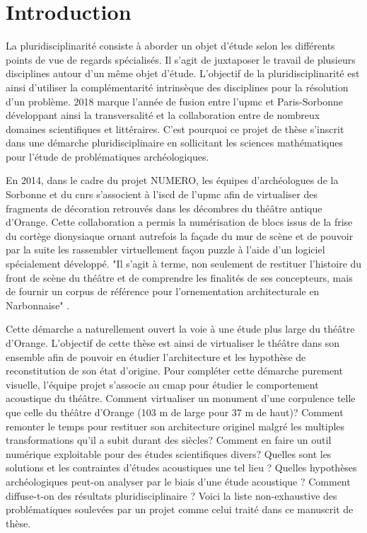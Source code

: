 \chapter*{Introduction}
	
	
			
			La pluridisciplinarité consiste à aborder un objet d'étude selon les différents points de vue de regards spécialisés. Il s'agit de juxtaposer le travail de plusieurs disciplines autour d'un même objet d'étude. L'objectif de la pluridisciplinarité est ainsi d'utiliser la complémentarité intrinsèque des disciplines pour la résolution d'un problème. 
			2018 marque l'année de fusion entre l'\gls{upmc} et Paris-Sorbonne développant ainsi la transversalité et la collaboration entre de nombreux domaines scientifiques et littéraires. C'est pourquoi ce projet de thèse s'inscrit dans une démarche pluridisciplinaire en sollicitant les sciences mathématiques pour l'étude de problématiques archéologiques.
						
						
			En 2014, dans le cadre du projet NUMERO, les équipes d'archéologues de la Sorbonne et du \gls{cnrs} s'associent à l'\gls{iscd} de l'\gls{upmc} afin de virtualiser des fragments de décoration retrouvés dans les décombres du théâtre antique d'Orange. Cette collaboration a permis la numérisation de blocs issus de la frise du cortège dionysiaque ornant autrefois la façade du mur de scène et de pouvoir par la suite les rassembler virtuellement façon puzzle à l'aide d'un logiciel spécialement développé. "Il s'agit à terme, non seulement de restituer l'histoire du front de scène du théâtre et de comprendre les finalités de ses concepteurs, mais de fournir un corpus de référence pour l'ornementation architecturale en Narbonnaise" \citep{PouvoirDuTheatre}.
			
			Cette démarche a naturellement ouvert la voie à une étude plus large du théâtre d'Orange. L'objectif de cette thèse est ainsi de virtualiser le théâtre dans son ensemble afin de pouvoir en étudier l'architecture et les hypothèse de reconstitution de son état d'origine. Pour compléter cette démarche purement visuelle, l'équipe projet s'associe au \gls{cmap} pour étudier le comportement acoustique du théâtre. Comment virtualiser un monument d'une corpulence telle que celle du théâtre d'Orange (103 m de large pour 37 m de haut)? Comment remonter le temps pour restituer son architecture originel malgré les multiples transformations qu'il a subit durant des siècles? Comment en faire un outil numérique exploitable pour des études scientifiques divers? Quelles sont les solutions et les contraintes d'études acoustiques une tel lieu ? Quelles hypothèses archéologiques peut-on analyser par le biais d'une étude acoustique ? Comment diffuse-t-on des résultats pluridisciplinaire ? Voici la liste non-exhaustive des problématiques soulevées par un projet comme celui traité dans ce manuscrit de thèse. 
